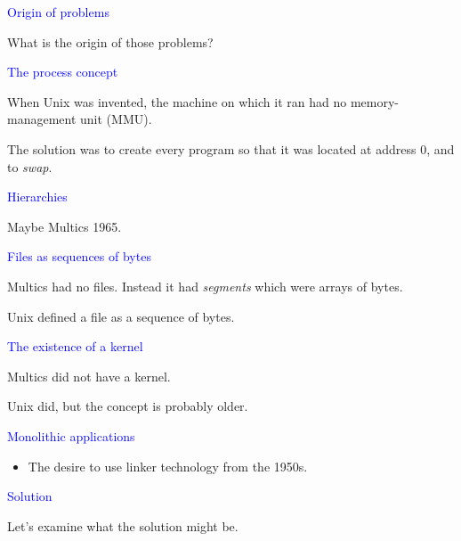 \documentclass{slides}
\newcommand{\ti}[1]{\begin{center}\Large{\textcolor{blue}{#1}}\end{center}}
\begin{document}
\begin{slide}\ti{Origin of problems}

What is the origin of those problems?

\vfill\end{slide}
\begin{slide}\ti{The process concept}

When Unix was invented, the machine on which it ran had no
memory-management unit (MMU).

The solution was to create every program so that it was located at
address 0, and to \emph{swap}.

\vfill\end{slide}
\begin{slide}\ti{Hierarchies}

Maybe Multics 1965.

\vfill\end{slide}
\begin{slide}\ti{Files as sequences of bytes}

Multics had no files.  Instead it had \emph{segments} which were
arrays of bytes.

Unix defined a file as a sequence of bytes.

\vfill\end{slide}
\begin{slide}\ti{The existence of a kernel}

Multics did not have a kernel.

Unix did, but the concept is probably older.

\vfill\end{slide}
\begin{slide}\ti{Monolithic applications}

  \begin{itemize}
  \item The desire to use linker technology from the 1950s.
  \end{itemize}

\vfill\end{slide}
\begin{slide}\ti{Solution}

Let's examine what the solution might be.

\vfill\end{slide}
\end{document}
